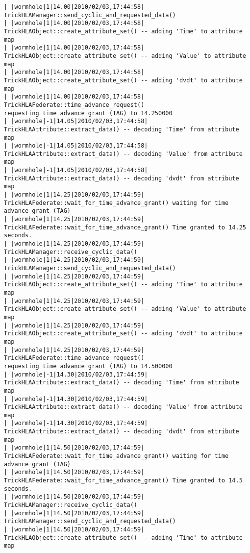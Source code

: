 \begin{lstlisting}[numbers=none,caption={output showing conditionally sent cyclic data}]
| |wormhole|1|14.00|2010/02/03,17:44:58| TrickHLAManager::send_cyclic_and_requested_data()
| |wormhole|1|14.00|2010/02/03,17:44:58| TrickHLAObject::create_attribute_set() -- adding 'Time' to attribute map
| |wormhole|1|14.00|2010/02/03,17:44:58| TrickHLAObject::create_attribute_set() -- adding 'Value' to attribute map
| |wormhole|1|14.00|2010/02/03,17:44:58| TrickHLAObject::create_attribute_set() -- adding 'dvdt' to attribute map
| |wormhole|1|14.00|2010/02/03,17:44:58| TrickHLAFederate::time_advance_request()   
requesting time advance grant (TAG) to 14.250000
| |wormhole|-1|14.05|2010/02/03,17:44:58| TrickHLAAttribute::extract_data() -- decoding 'Time' from attribute map
| |wormhole|-1|14.05|2010/02/03,17:44:58| TrickHLAAttribute::extract_data() -- decoding 'Value' from attribute map
| |wormhole|-1|14.05|2010/02/03,17:44:58| TrickHLAAttribute::extract_data() -- decoding 'dvdt' from attribute map
| |wormhole|1|14.25|2010/02/03,17:44:59| TrickHLAFederate::wait_for_time_advance_grant() waiting for time advance grant (TAG)
| |wormhole|1|14.25|2010/02/03,17:44:59| TrickHLAFederate::wait_for_time_advance_grant() Time granted to 14.25 seconds.
| |wormhole|1|14.25|2010/02/03,17:44:59| TrickHLAManager::receive_cyclic_data()
| |wormhole|1|14.25|2010/02/03,17:44:59| TrickHLAManager::send_cyclic_and_requested_data()
| |wormhole|1|14.25|2010/02/03,17:44:59| TrickHLAObject::create_attribute_set() -- adding 'Time' to attribute map
| |wormhole|1|14.25|2010/02/03,17:44:59| TrickHLAObject::create_attribute_set() -- adding 'Value' to attribute map
| |wormhole|1|14.25|2010/02/03,17:44:59| TrickHLAObject::create_attribute_set() -- adding 'dvdt' to attribute map
| |wormhole|1|14.25|2010/02/03,17:44:59| TrickHLAFederate::time_advance_request()   
requesting time advance grant (TAG) to 14.500000
| |wormhole|-1|14.30|2010/02/03,17:44:59| TrickHLAAttribute::extract_data() -- decoding 'Time' from attribute map
| |wormhole|-1|14.30|2010/02/03,17:44:59| TrickHLAAttribute::extract_data() -- decoding 'Value' from attribute map
| |wormhole|-1|14.30|2010/02/03,17:44:59| TrickHLAAttribute::extract_data() -- decoding 'dvdt' from attribute map
| |wormhole|1|14.50|2010/02/03,17:44:59| TrickHLAFederate::wait_for_time_advance_grant() waiting for time advance grant (TAG)
| |wormhole|1|14.50|2010/02/03,17:44:59| TrickHLAFederate::wait_for_time_advance_grant() Time granted to 14.5 seconds.
| |wormhole|1|14.50|2010/02/03,17:44:59| TrickHLAManager::receive_cyclic_data()
| |wormhole|1|14.50|2010/02/03,17:44:59| TrickHLAManager::send_cyclic_and_requested_data()
| |wormhole|1|14.50|2010/02/03,17:44:59| TrickHLAObject::create_attribute_set() -- adding 'Time' to attribute map

\end{lstlisting}
